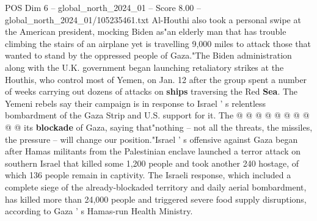 \begin{textsample}{POS Dim 6 – global\_north\_2024\_01 – Score 8.00 – global\_north\_2024\_01/105235461.txt}
Al-Houthi also took a personal swipe at the American president, mocking Biden as"an elderly man that has trouble climbing the stairs of an airplane yet is travelling 9,000 miles to attack those that wanted to stand by the oppressed people of Gaza."The Biden administration along with the U.K. government began launching retaliatory strikes at the Houthis, who control most of Yemen, on Jan. 12 after the group spent a number of weeks carrying out dozens of attacks on \textbf{ships} traversing the Red \textbf{Sea}.
The Yemeni rebels say their campaign is in response to Israel ' s relentless bombardment of the Gaza Strip and U.S. support for it.
The @ @ @ @ @ @ @ @ @ @ its \textbf{blockade} of Gaza, saying that"nothing -- not all the threats, the missiles, the pressure -- will change our position."Israel ' s offensive against Gaza began after Hamas militants from the Palestinian enclave launched a terror attack on southern Israel that killed some 1,200 people and took another 240 hostage, of which 136 people remain in captivity.
The Israeli response, which included a complete siege of the already-blockaded territory and daily aerial bombardment, has killed more than 24,000 people and triggered severe food supply disruptions, according to Gaza ' s Hamas-run Health Ministry.

\end{textsample}
